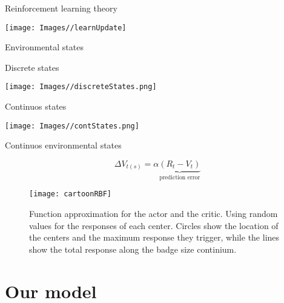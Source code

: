 \documentclass[ignorenonframetext,]{beamer}
\begin{document}
\begin{frame}{Reinforcement learning theory}

\begin{center}\texttt{[image: Images//learnUpdate]} \end{center}

\end{frame}

\begin{frame}{Environmental states}

\begin{block}{Discrete states}

\texttt{[image: Images//discreteStates.png]}

\pause

\end{block}

\begin{block}{Continuos states}

\texttt{[image: Images//contStates.png]}

\end{block}

\end{frame}

\begin{frame}{Continuos environmental states}

\begin{equation*}
  \Delta V_{t(s)}=\alpha \underbrace{(R_t-V_t)}_\text{prediction error}
\end{equation*}

\begin{figure}
\texttt{[image: cartoonRBF]} \caption{\label{fig:learning_cartoonRBF}Function approximation for the actor and the critic. Using random values for the responses of each center. Circles show the location of the centers and the maximum response they trigger, while the lines show the total response along the badge size continium.}\label{fig:fig2}
\end{figure}

\end{frame}

\section{Our model}\label{our-model}
\end{document}
